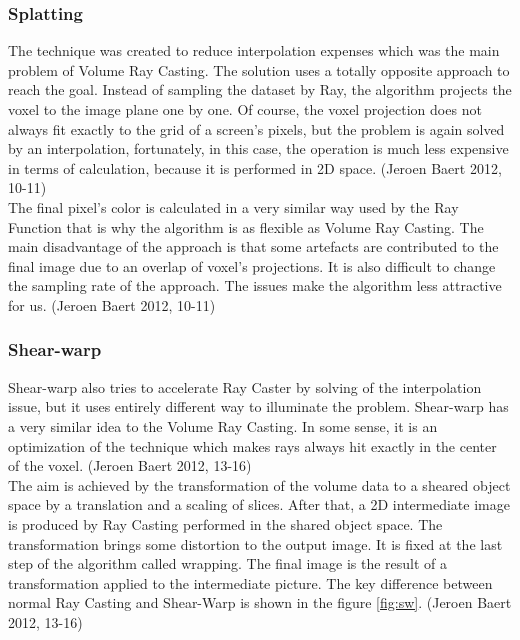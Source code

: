 \documentclass[twoside, english, 11pt]{report}
\begin{document}
\subsubsection{Splatting}

The technique was created to reduce interpolation expenses which was the main problem of Volume Ray Casting. The solution uses a totally opposite approach to reach the goal. Instead of sampling the dataset by Ray, the algorithm projects the voxel to the image plane one by one. Of course, the voxel projection does not always fit exactly to the grid of a screen's pixels, but the problem is again solved by an interpolation, fortunately, in this case, the operation is much less expensive in terms of calculation, because it is performed in 2D space. (Jeroen Baert 2012, 10-11)\\

The final pixel's color is calculated in a very similar way used by the Ray Function that is why the algorithm is as flexible as Volume Ray Casting. The main disadvantage of the approach is that some artefacts are contributed to the final image due to an overlap of voxel's projections. It is also difficult to change the sampling rate of the approach. The issues make the algorithm less attractive for us. (Jeroen Baert 2012, 10-11)\\

\subsubsection{Shear-warp}

Shear-warp also tries to accelerate Ray Caster by solving of the interpolation issue, but it uses entirely different way to illuminate the problem. Shear-warp has a very similar idea to the Volume Ray Casting. In some sense, it is an optimization of the technique which makes rays always hit exactly in the center of the voxel. (Jeroen Baert 2012, 13-16)\\

The aim is achieved by the transformation of the volume data to a sheared object space by a translation and a scaling of slices. After that, a 2D intermediate image is produced by Ray Casting performed in the shared object space. The transformation brings some distortion to the output image. It is fixed at the last step of the algorithm called wrapping. The final image is the result of a transformation applied to the intermediate picture. The key difference between normal Ray Casting and Shear-Warp is shown in the figure \ref{fig:sw}. (Jeroen Baert 2012, 13-16)\\
\end{document}
